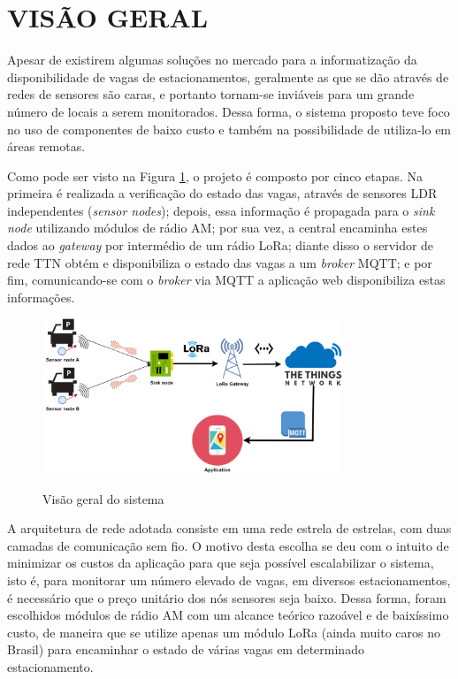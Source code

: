 \documentclass[oneside,openright,12pt]{ufsm_2015} %
\begin{document}
    \section{VISÃO GERAL}
    Apesar de existirem algumas soluções no mercado para a informatização da disponibilidade de vagas de estacionamentos, geralmente as que se dão através de redes de sensores são caras, e portanto tornam-se inviáveis para um grande número de locais a serem monitorados. Dessa forma, o sistema proposto teve foco no uso de componentes de baixo custo e também na possibilidade de utiliza-lo em áreas remotas.
    
    Como pode ser visto na Figura \ref{fig:visao-geral}, o projeto é composto por cinco etapas. Na primeira é realizada a verificação do estado das vagas, através de sensores LDR independentes (\textit{sensor nodes}); depois, essa informação é propagada para o \textit{sink node} utilizando módulos de rádio AM; por sua vez, a central encaminha estes dados ao \textit{gateway} por intermédio de um rádio LoRa; diante disso o servidor de rede TTN obtém e disponibiliza o estado das vagas a um \textit{broker} MQTT; e por fim, comunicando-se com o \textit{broker} via MQTT a aplicação web disponibiliza estas informações.
    
    \begin{figure}[ht]
     	   \caption{\label{exepretex} Visão geral do sistema}
            \centering
            \includegraphics[width=0.8\textwidth]{figuras/funcionamento.png}
            \vspace{\baselineskip} %
                \label{fig:visao-geral}
    \end{figure}
    
    A arquitetura de rede adotada consiste em uma rede estrela de estrelas, com duas camadas de comunicação sem fio. O motivo desta escolha se deu com o intuito de minimizar os custos da aplicação para que seja possível escalabilizar o sistema, isto é, para monitorar um número elevado de vagas, em diversos estacionamentos, é necessário que o preço unitário dos nós sensores seja baixo. Dessa forma, foram escolhidos módulos de rádio AM com um alcance teórico razoável e de baixíssimo custo, de maneira que se utilize apenas um módulo LoRa (ainda muito caros no Brasil) para encaminhar o estado de várias vagas em determinado estacionamento. 
    
\end{document}
